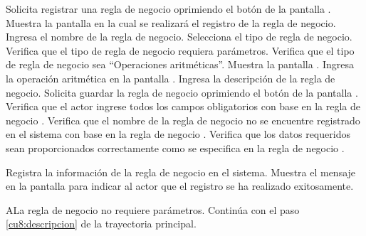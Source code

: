  \begin{UCtrayectoria}
    \UCpaso[\UCactor] Solicita registrar una regla de negocio oprimiendo el botón  de la pantalla .
    \UCpaso[\UCsist] Muestra la pantalla  en la cual se realizará el registro de la regla de negocio. 
    \UCpaso[\UCactor] Ingresa el nombre de la regla de negocio. \label{cu8.1:ingresaDatos}
    \UCpaso[\UCactor] Selecciona el tipo de regla de negocio. 
    \UCpaso[\UCsist] Verifica que el tipo de regla de negocio requiera parámetros. 
    \UCpaso[\UCsist] Verifica que el tipo de regla de negocio sea ``Operaciones aritméticas''. 
    \UCpaso[\UCsist] Muestra la pantalla .
    \UCpaso[\UCactor] Ingresa la operación aritmética en la pantalla .        \label{cu8:ingresaPaso}
    \UCpaso[\UCactor] Ingresa la descripción de la regla de negocio. \label{cu8:descripcion}
    \UCpaso[\UCactor] Solicita guardar la regla de negocio oprimiendo el botón  de la pantalla .  
    \UCpaso[\UCsist] Verifica que el actor ingrese todos los campos obligatorios con base en la regla de negocio  . 
    \UCpaso[\UCsist] Verifica que el nombre de la regla de negocio no se encuentre registrado en el sistema con base en la regla de negocio  . 
    \UCpaso[\UCsist] Verifica que los datos requeridos sean proporcionados correctamente como se especifica en la regla de negocio . 
    
    \UCpaso[\UCsist] Registra la información de la regla de negocio en el sistema.
    \UCpaso[\UCsist] Muestra el mensaje  en la pantalla 
    para indicar al actor que el registro se ha realizado exitosamente.
 \end{UCtrayectoria}
 
 
 \begin{UCtrayectoriaA}{A}{La regla de negocio no requiere parámetros.}
	\UCpaso[] Continúa con el paso \ref{cu8:descripcion} de la trayectoria principal.
 \end{UCtrayectoriaA}
 
